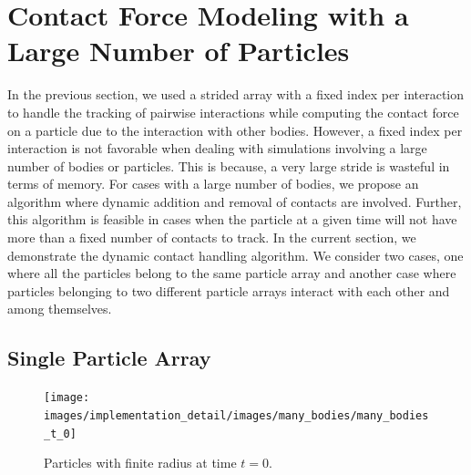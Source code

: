 \section{Contact Force Modeling with a Large Number of Particles}
\label{sec:tracking-many-bodies}
In the previous section, we used a strided array with a fixed index per
interaction to handle the tracking of pairwise interactions while computing the
contact force on a particle due to the interaction with other bodies. However, a
fixed index per interaction is not favorable when dealing with simulations
involving a large number of bodies or particles. This is because, a very large
stride is wasteful in terms of memory. For cases with a large number of bodies,
we propose an algorithm where dynamic addition and removal of contacts are
involved. Further, this algorithm is feasible in cases when the particle at a
given time will not have more than a fixed number of contacts to track. In the
current section, we demonstrate the dynamic contact handling algorithm. We
consider two cases, one where all the particles belong to the same particle
array and another case where particles belonging to two different particle
arrays interact with each other and among themselves.

\subsection{Single Particle Array}
\begin{figure}[!htpb]
  \centering
  \texttt{[image: images/implementation\_detail/images/many\_bodies/many\_bodies\_t\_0]}
  \caption{Particles with finite radius at time $t=0$.}
\label{fig:id:15_particle_t_0}
\end{figure}

